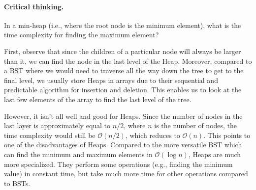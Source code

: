 \documentclass[10pt]{article}
\begin{document}
\paragraph{Critical thinking.}
In a min-heap (i.e., where the root node is the minimum element),
what is the time complexity for finding the maximum element?

First, observe that since the children of a particular node will always
be larger than it, we can find the node in the last level of the Heap.
Moreover, compared to a BST where we would need to traverse all the way down the
tree to get to the final level,
we usually store Heaps in arrays due to their sequential and predictable algorithm
for insertion and deletion.
This enables us to look at the last few elements of the array to find the last level
of the tree.

However, it isn't all well and good for Heaps.
Since the number of nodes in the last layer is approximately equal to $n/2$, where
$n$ is the number of nodes, the time complexity would still be $\mathcal{O}(n/2)$,
which reduces to $\mathcal{O}(n)$.
This points to one of the disadvantages of Heaps.
Compared to the more versatile BST which can find the minimum and maximum
elements in $\mathcal{O}(\log{}n)$,
Heaps are much more specialized.
They perform some operations (e.g., finding the minimum value)
in constant time, but take much more time for other operations compared to BSTs.
\end{document}
